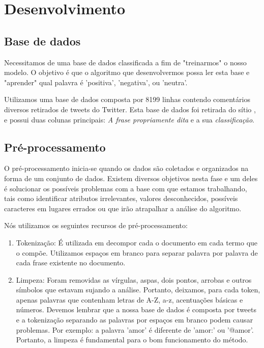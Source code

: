 \documentclass[
article,			%
12pt,				%
a4paper,			%
english,			%
brazil,				%
sumario=tradicional,
twoside
]{abntex2}
\begin{document}
	\section{Desenvolvimento}
	
	
	
	\subsection{Base de dados}
	\label{Base}
	Necessitamos de uma base de dados classificada a fim de "treinarmos" o nosso modelo. O objetivo é que o algoritmo que desenvolvermos possa ler esta base e "aprender" qual palavra é 'positiva', 'negativa', ou 'neutra'.
	
	Utilizamos uma base de dados composta por 8199 linhas contendo comentários diversos retirados de tweets do Twitter. Esta base de dados foi retirada do sítio
	\cite{minerandodados},  e possui duas colunas principais: \emph{A frase propriamente dita} e a sua \emph{classificação}.
	
		
	\subsection{Pré-processamento}
	O pré-processamento inicia-se quando os dados são coletados e organizados na forma de um conjunto de dados. Existem diversos objetivos nesta fase e um deles é solucionar os possíveis problemas com a base com que estamos trabalhando, tais como identificar atributos irrelevantes, valores desconhecidos, possíveis caracteres em lugares errados ou que irão atrapalhar a análise do algoritmo.
	
	Nós utilizamos os seguintes recursos de pré-processamento:
	\begin{enumerate}
		\item Tokenização: É utilizada em decompor cada o documento em cada termo que o compõe. Utilizamos espaços em branco para separar palavra por palavra de cada frase existente no documento.
		\item Limpeza: Foram removidas as vírgulas, aspas, dois pontos, arrobas e outros símbolos que estavam sujando a análise. Portanto, deixamos, para cada token, apenas palavras que contenham letras de A-Z, a-z, acentuações básicas e números.
		Devemos lembrar que a nossa base de dados é composta por tweets e a tokenização separando as palavras por espaços em branco podem causar problemas. Por exemplo: a palavra 'amor' é diferente de 'amor:' ou '@amor'. Portanto, a limpeza é fundamental para o bom funcionamento do método.
	\end{enumerate}
	
\end{document}
